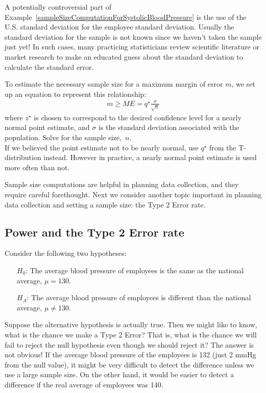 A potentially controversial part of Example~\ref{sampleSizeComputationForSystolicBloodPressure} is the use of the U.S. standard deviation for the employee standard deviation. Usually the standard deviation for the sample is not known since we haven't taken the sample just yet! In such cases, many practicing statisticians review scientific literature or market research to make an educated guess about the standard deviation to calculate the standard error. 

\begin{termBox}{
To estimate the necessary sample size for a maximum margin of error $m$, we set up an equation to represent this relationship:
\begin{align*}
m \geq ME = q^{\star}\frac{\sigma}{\sqrt{n}}
\end{align*}
where $z^{\star}$ is chosen to correspond to the desired confidence level for a nearly normal point estimate, and $\sigma$ is the standard deviation associated with the population. Solve for the sample size,~$n$.\\
If we believed the point estimate not to be nearly normal, use $q^{\star}$ from the T-distribution instead. However in practice, a nearly normal point estimate is used more often than not.}
\end{termBox}

Sample size computations are helpful in planning data collection, and they require careful forethought. Next we consider another topic important in planning data collection and setting a sample size: the Type 2 Error rate.



\subsection{Power and the Type 2 Error rate}

Consider the following two hypotheses:
\begin{itemize}
\setlength{\itemsep}{0.5mm}
\item[$H_0$:] The average blood pressure of employees is the same as the national average, $\mu = 130$.
\item[$H_A$:] The average blood pressure of employees is different than the national average, $\mu \neq 130$.
\end{itemize}
Suppose the alternative hypothesis is actually true. Then we might like to know, what is the chance we make a Type 2 Error? That is, what is the chance we will fail to reject the null hypothesis even though we should reject it? The answer is not obvious! If the average blood pressure of the employees is 132 (just 2 mmHg from the null value), it might be very difficult to detect the difference unless we use a large sample size. On the other hand, it would be easier to detect a difference if the real average of employees was 140.

